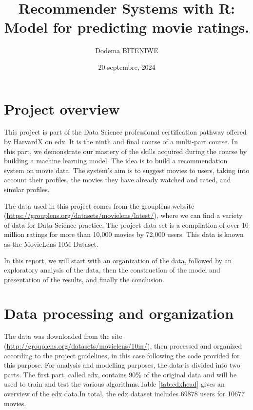 \documentclass[
]{article}
\title{Recommender Systems with R: Model for predicting movie ratings.}
\author{Dodema BITENIWE}
\date{20 septembre, 2024}
\begin{document}
\maketitle

{
\setcounter{tocdepth}{2}
\tableofcontents
}
\section{Project overview}\label{project-overview}

This project is part of the Data Science professional certification pathway offered by HarvardX on edx. It is the ninth and final course of a multi-part course. In this part, we demonstrate our mastery of the skills acquired during the course by building a machine learning model. The idea is to build a recommendation system on movie data. The system's aim is to suggest movies to users, taking into account their profiles, the movies they have already watched and rated, and similar profiles.

The data used in this project comes from the grouplens website (\url{https://grouplens.org/datasets/movielens/latest/}), where we can find a variety of data for Data Science practice. The project data set is a compilation of over 10 million ratings for more than 10,000 movies by 72,000 users. This data is known as the MovieLens 10M Dataset.

In this report, we will start with an organization of the data, followed by an exploratory analysis of the data, then the construction of the model and presentation of the results, and finally the conclusion.

\section{Data processing and organization}\label{data-processing-and-organization}

The data was downloaded from the site (\url{http://grouplens.org/datasets/movielens/10m/}), then processed and organized according to the project guidelines, in this case following the code provided for this purpose. For analysis and modelling purposes, the data is divided into two parts. The first part, called edx, contains 90\% of the original data and will be used to train and test the various algorithms.Table \ref{tab:edxhead} gives an overview of the edx data.In total, the edx dataset includes 69878 users for 10677 movies.
\end{document}
